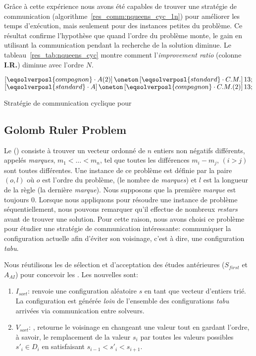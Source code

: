 Grâce à cette expérience nous avons été capables de trouver une stratégie de communication (algorithme~\ref{res_comm:nqueens_cyc_1n}) pour améliorer les temps d'exécution, mais seulement pour des instances petites du problème. Ce résultat confirme l'hypothèse que quand l'ordre du problème monte, le gain en utilisant la communication pendant la recherche de la solution diminue. Le tableau~\ref{res_tab:nqueens_cyc} montre comment l'\textit{improvement ratio} (colonne \textbf{I.R.}) diminue avec l'ordre $N$. 

\begin{algorithm}[!h]
\dontprintsemicolon
\SetNoline
$\left[\eqsolverposl{compagnon}\cdot A(2)\right] \oneton \left[\eqsolverposl{standard}\cdot C.M.\right]13;$\;
$\left[\eqsolverposl{standard}\cdot A\right] \oneton \left[\eqsolverposl{compagnon}\cdot C.M.(2)\right]13;$
\caption{Stratégie de communication cyclique \oneTn{} pour \NQP}\label{res_comm:nqueens_cyc_1n}
\end{algorithm}




\subsection{Golomb Ruler Problem}

Le \grp{} (\GRP) consiste à trouver un vecteur ordonné de $n$ entiers non négatifs différents, appelés \textit{marques}, $m_1<\dots<m_n$, tel que toutes les différences $m_i- m_j$, $(i>j)$ sont toutes différentes. Une instance de ce problème est définie par la paire $(o,l)$ où $o$ est l'ordre du problème, (le nombre de \textit{marques}) et  $l$ est la longueur de la règle (la dernière {\it marque}). Nous supposons que la première \textit{marque} est toujours 0. Lorsque nous appliquons \posl{} pour résoudre une instance de problème séquentiellement, nous pouvons remarquer qu'il effectue de nombreux {\it restars} avant de trouver une solution. Pour cette raison, nous avons choisi ce problème pour étudier une stratégie de communication intéressante: communiquer la configuration actuelle afin d'éviter son voisinage, c'est à dire, une configuration {\it tabu}.

Nous réutilisons les \ms{} de sélection et d'acceptation des études antérieures ($S_{first}$ et$A_{AI}$) pour concevoir les \ass. Les nouvelles \ms{} sont:
\begin{enumerate}
\item $I_{sort}$: renvoie une configuration aléatoire $s$ en tant que vecteur d'entiers trié. La configuration est générée \textit{loin} de l'ensemble des configurations {\it tabu} arrivées via communication entre solveurs.
\item $V_{sort}$: , retourne le voisinage en changeant une valeur tout en gardant l'ordre, à savoir, le remplacement de la valeur $s_i$ par toutes les valeurs possibles $s'_i \in D_i$ en satisfaisant $s_{i-1}< s'_i < s_{i+1}$.
\end{enumerate}

